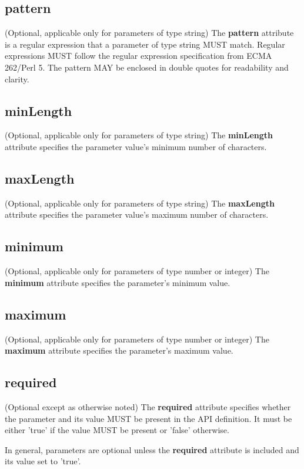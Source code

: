 \subsection{pattern}
(Optional, applicable only for parameters of type string)
The \textbf{pattern} attribute is a regular expression that a parameter of type string MUST match. Regular expressions MUST follow the regular expression specification from ECMA 262/Perl 5. The pattern MAY be enclosed in double quotes for readability and clarity.

\subsection{minLength}
(Optional, applicable only for parameters of type string)
The \textbf{minLength} attribute specifies the parameter value's minimum number of characters.

\subsection{maxLength}
(Optional, applicable only for parameters of type string)
The \textbf{maxLength} attribute specifies the parameter value's maximum number of characters.

\subsection{minimum}
(Optional, applicable only for parameters of type number or integer)
The \textbf{minimum} attribute specifies the parameter's minimum value.

\subsection{maximum}
(Optional, applicable only for parameters of type number or integer)
The \textbf{maximum} attribute specifies the parameter's maximum value.


\subsection{required}
(Optional except as otherwise noted)
The \textbf{required} attribute specifies whether the parameter and its value MUST be present in the API definition. It must be either 'true' if the value MUST be present or 'false' otherwise.

In general, parameters are optional unless the \textbf{required} attribute is included and its value set to 'true'.

